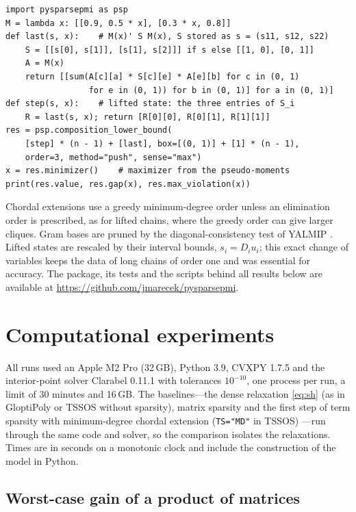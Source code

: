 \documentclass[smallextended]{svjour3}
\newcommand{\code}[1]{\texttt{#1}}
\begin{document}
\begin{lstlisting}
import pysparsepmi as psp
M = lambda x: [[0.9, 0.5 * x], [0.3 * x, 0.8]]
def last(s, x):    # M(x)' S M(x), S stored as s = (s11, s12, s22)
    S = [[s[0], s[1]], [s[1], s[2]]] if s else [[1, 0], [0, 1]]
    A = M(x)
    return [[sum(A[c][a] * S[c][e] * A[e][b] for c in (0, 1)
                 for e in (0, 1)) for b in (0, 1)] for a in (0, 1)]
def step(s, x):    # lifted state: the three entries of S_i
    R = last(s, x); return [R[0][0], R[0][1], R[1][1]]
res = psp.composition_lower_bound(
    [step] * (n - 1) + [last], box=[(0, 1)] + [1] * (n - 1),
    order=3, method="push", sense="max")
x = res.minimizer()    # maximizer from the pseudo-moments
print(res.value, res.gap(x), res.max_violation(x))
\end{lstlisting}

Chordal extensions use a greedy minimum-degree order unless an elimination
order is prescribed, as for lifted chains, where the greedy order can give
larger cliques. Gram bases are pruned by the diagonal-consistency test of
YALMIP \cite{Lofberg2009}. Lifted states are rescaled by their interval
bounds, $s_i=D_iu_i$; this exact change of variables keeps the data of long
chains of order one and was essential for accuracy. The package, its tests
and the scripts behind all results below are available at
\url{https://github.com/jmarecek/pysparsepmi}.

\section{Computational experiments}
\label{sec:experiments}

All runs used an Apple M2 Pro (32\,GB), Python 3.9, CVXPY 1.7.5 and the
interior-point solver Clarabel 0.11.1 \cite{Clarabel2026} with tolerances
$10^{-10}$, one process per run, a limit of 30 minutes and 16\,GB.
The baselines---the dense relaxation \eqref{eq:sh} (as in GloptiPoly or
TSSOS without sparsity), matrix sparsity \cite{ZhengFantuzzi2023} and the
first step of term sparsity with minimum-degree chordal extension
(\code{TS="MD"} in TSSOS) \cite{MillerWangGuo2026}---run through the same
code and solver, so the comparison isolates the relaxations. Times are in
seconds on a monotonic clock and include the construction of the model in
Python.

\subsection{Worst-case gain of a product of matrices}
\label{sec:gain}
\end{document}
